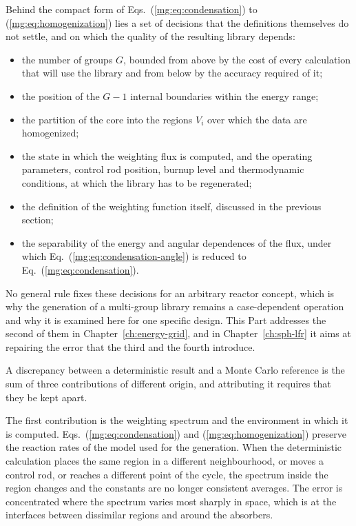Behind the compact form of Eqs.~(\ref{mg:eq:condensation}) to
(\ref{mg:eq:homogenization}) lies a set of decisions that the definitions
themselves do not settle, and on which the quality of the resulting library
depends:
%
\begin{itemize}
  \item the number of groups $G$, bounded from above by the cost of every
        calculation that will use the library and from below by the accuracy
        required of it;
  \item the position of the $G-1$ internal boundaries within the energy range;
  \item the partition of the core into the regions $V_i$ over which the data are
        homogenized;
  \item the state in which the weighting flux is computed, and the operating
        parameters, control rod position, burnup level and thermodynamic
        conditions, at which the library has to be regenerated;
  \item the definition of the weighting function itself, discussed in the
        previous section;
  \item the separability of the energy and angular dependences of the flux,
        under which Eq.~(\ref{mg:eq:condensation-angle}) is reduced to
        Eq.~(\ref{mg:eq:condensation}).
\end{itemize}
%
No general rule fixes these decisions for an arbitrary reactor concept, which is
why the generation of a multi-group library remains a case-dependent operation
and why it is examined here for one specific design. This Part addresses the
second of them in Chapter~\ref{ch:energy-grid}, and in Chapter~\ref{ch:sph-lfr}
it aims at repairing the error that the third and the fourth introduce.

A discrepancy between a deterministic result and a Monte Carlo reference is the
sum of three contributions of different origin, and attributing it requires
that they be kept apart.

The first contribution is the weighting spectrum and the environment in which it
is computed. Eqs.~(\ref{mg:eq:condensation}) and (\ref{mg:eq:homogenization})
preserve the reaction rates of the model used for the generation. When the
deterministic calculation places the same region in a different neighbourhood,
or moves a control rod, or reaches a different point of the cycle, the spectrum
inside the region changes and the constants are no longer consistent averages.
The error is concentrated where the spectrum varies most sharply in space, which
is at the interfaces between dissimilar regions and around the absorbers.

